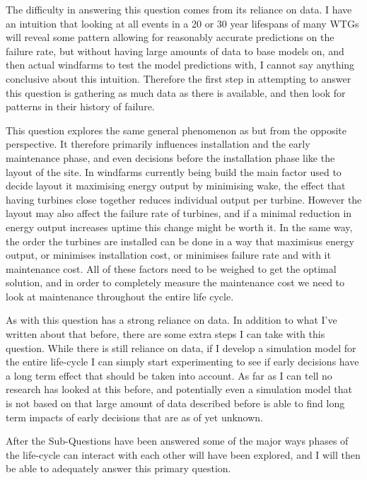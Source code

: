 \documentclass[a4paper,12pt]{article}
\begin{document}
The difficulty in answering this question comes from its reliance on data. I have an intuition that looking at all events in a 20 or 30 year lifespans of many WTGs will reveal some pattern allowing for reasonably accurate predictions on the failure rate, but without having large amounts of data to base models on, and then actual windfarms to test the model predictions with, I cannot say anything conclusive about this intuition. Therefore the first step in attempting to answer this question is gathering as much data as there is available, and then look for patterns in their history of failure. 

\sqc*

This question explores the same general phenomenon as  but from the opposite perspective. It therefore primarily influences installation and the early maintenance phase, and even decisions before the installation phase like the layout of the site. In windfarms currently being build the main factor used to decide layout it maximising energy output by minimising wake, the effect that having turbines close together reduces individual output per turbine. However the layout may also affect the failure rate of turbines, and if a minimal reduction in energy output increases uptime this change might be worth it. In the same way, the order the turbines are installed can be done in a way that maximisus energy output, or minimises installation cost, or minimises failure rate and with it maintenance cost. All of these factors need to be weighed to get the optimal solution, and in order to completely measure the maintenance cost we need to look at maintenance throughout the entire life cycle. 

As with  this question has a strong reliance on data. In addition to what I've written about that before, there are some extra steps I can take with this question. While there is still reliance on data, if I develop a simulation model for the entire life-cycle I can simply start experimenting to see if early decisions have a long term effect that should be taken into account. As far as I can tell no research has looked at this before, and potentially even a simulation model that is not based on that large amount of data described before is able to find long term impacts of early decisions that are as of yet unknown. 

\rquest*

After the Sub-Questions have been answered some of the major ways phases of the life-cycle can interact with each other will have been explored, and I will then be able to adequately answer this primary question. 
\end{document}
